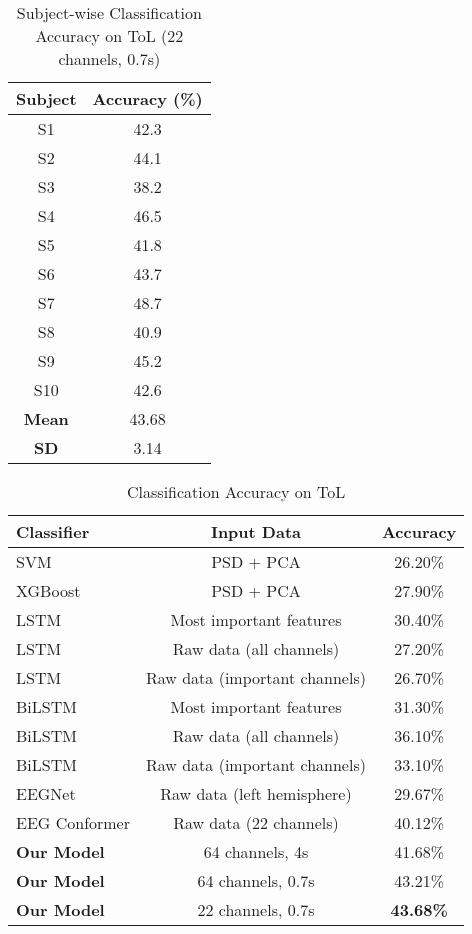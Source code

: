 \documentclass[pdflatex,sn-mathphys-num]{sn-jnl}%
\theoremstyle{thmstyleone}
\theoremstyle{thmstyletwo}
\theoremstyle{thmstylethree}
\begin{document}
\begin{table}[h]
\centering
\caption{Subject-wise Classification Accuracy on ToL (22 channels, 0.7s)}
\label{tab:tol_subject}
\begin{tabular}{|c|c|}
\hline
\textbf{Subject} & \textbf{Accuracy (\%)} \\
\hline
S1 & 42.3 \\
S2 & 44.1 \\
S3 & 38.2 \\
S4 & 46.5 \\
S5 & 41.8 \\
S6 & 43.7 \\
S7 & 48.7 \\
S8 & 40.9 \\
S9 & 45.2 \\
S10 & 42.6 \\
\hline
\textbf{Mean} & 43.68 \\
\textbf{SD} & 3.14 \\
\hline
\end{tabular}
\end{table}

\begin{table}[h]
\centering
\caption{Classification Accuracy on ToL}
\label{tab:performance_comparison_tol}
\begin{tabular}{lcc}
\toprule
\textbf{Classifier} & \textbf{Input Data} & \textbf{Accuracy} \\
\midrule
SVM & PSD + PCA & 26.20\% \\
XGBoost & PSD + PCA & 27.90\% \\
LSTM & Most important features & 30.40\% \\
LSTM & Raw data (all channels) & 27.20\% \\
LSTM & Raw data (important channels) & 26.70\% \\
BiLSTM & Most important features & 31.30\% \\
BiLSTM & Raw data (all channels) & 36.10\% \\
BiLSTM & Raw data (important channels) & 33.10\% \\
EEGNet & Raw data (left hemisphere) & 29.67\% \\
EEG Conformer & Raw data (22 channels) & 40.12\% \\
\textbf{Our Model} & 64 channels, 4s & 41.68\% \\
\textbf{Our Model} & 64 channels, 0.7s & 43.21\% \\
\textbf{Our Model} & 22 channels, 0.7s & \textbf{43.68\%} \\
\bottomrule
\end{tabular}
\end{table}
\end{document}
